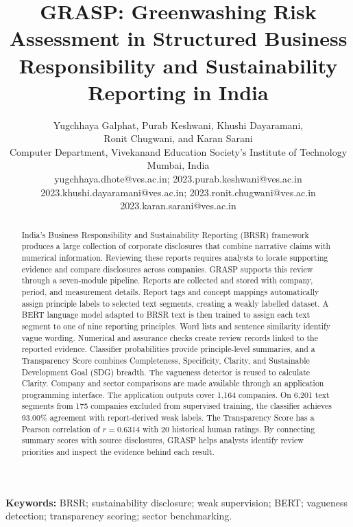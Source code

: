 \documentclass[11pt,a4paper,onecolumn]{article}
\title{\textbf{GRASP: Greenwashing Risk Assessment in Structured Business Responsibility and Sustainability Reporting in India}}
\author{\normalsize Yugchhaya Galphat, Purab Keshwani, Khushi Dayaramani,\\
\normalsize Ronit Chugwani, and Karan Sarani\\[5pt]
\small Computer Department, Vivekanand Education Society's Institute of Technology\\
\small Mumbai, India\\[3pt]
\footnotesize yugchhaya.dhote@ves.ac.in; 2023.purab.keshwani@ves.ac.in\\
\footnotesize 2023.khushi.dayaramani@ves.ac.in; 2023.ronit.chugwani@ves.ac.in\\
\footnotesize 2023.karan.sarani@ves.ac.in}
\date{}
\begin{document}
\maketitle
\begin{abstract}
India's Business Responsibility and Sustainability Reporting (BRSR) framework produces a large collection of corporate disclosures that combine narrative claims with numerical information. Reviewing these reports requires analysts to locate supporting evidence and compare disclosures across companies. GRASP supports this review through a seven-module pipeline. Reports are collected and stored with company, period, and measurement details. Report tags and concept mappings automatically assign principle labels to selected text segments, creating a weakly labelled dataset. A BERT language model adapted to BRSR text is then trained to assign each text segment to one of nine reporting principles. Word lists and sentence similarity identify vague wording. Numerical and assurance checks create review records linked to the reported evidence. Classifier probabilities provide principle-level summaries, and a Transparency Score combines Completeness, Specificity, Clarity, and Sustainable Development Goal (SDG) breadth. The vagueness detector is reused to calculate Clarity. Company and sector comparisons are made available through an application programming interface. The application outputs cover 1,164 companies. On 6,201 text segments from 175 companies excluded from supervised training, the classifier achieves 93.00\% agreement with report-derived weak labels. The Transparency Score has a Pearson correlation of $r=0.6314$ with 20 historical human ratings. By connecting summary scores with source disclosures, GRASP helps analysts identify review priorities and inspect the evidence behind each result.
\end{abstract}
\noindent\textbf{Keywords:} BRSR; sustainability disclosure; weak supervision; BERT; vagueness detection; transparency scoring; sector benchmarking.









\end{document}
